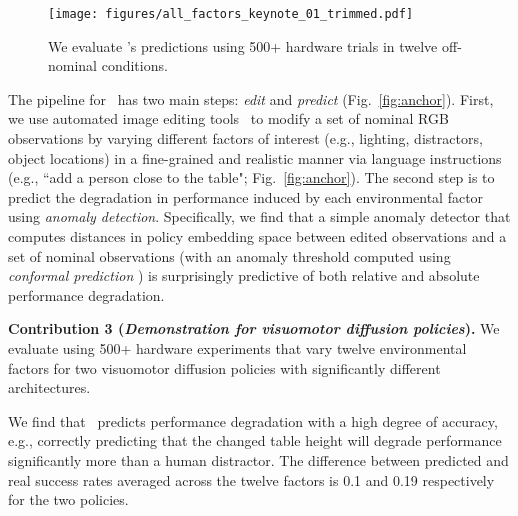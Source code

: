 \begin{figure*}[t]
    \centering
    \texttt{[image: figures/all\_factors\_keynote\_01\_trimmed.pdf]}
    \caption{We evaluate \redit's predictions using 500+ hardware trials in twelve off-nominal conditions.}
    \label{fig:all factors}
    \vspace{-5pt}
\end{figure*}

The pipeline for \redit~has two main steps: \emph{edit} and \emph{predict} (Fig.~\ref{fig:anchor}). First, we use automated image editing tools~\cite{baldridge2024imagen, esser2024scaling, controlnet, saharia2022photorealistic} to modify a set of nominal RGB observations by varying different factors of interest (e.g., lighting, distractors, object locations) in a fine-grained and realistic manner via language instructions (e.g., ``add a person close to the table"; Fig.~\ref{fig:anchor}). The second step is to predict the degradation in performance induced by each environmental factor using \emph{anomaly detection}. Specifically, we find that a simple anomaly detector that computes distances in policy embedding space between edited observations and a set of nominal observations (with an anomaly threshold computed using \emph{conformal prediction} \cite{vovk2005algorithmic}) is surprisingly predictive of both relative and absolute performance degradation. 


\vspace{2pt}
{\bf Contribution 3 (\emph{Demonstration for visuomotor diffusion policies}).} We evaluate \redit using 500+ hardware experiments that vary twelve environmental factors for two visuomotor diffusion policies with significantly different architectures.
\vspace{2pt}

We find that \redit~predicts performance degradation with a high degree of accuracy, e.g., correctly predicting that the changed table height will degrade performance significantly more than a human distractor. The difference between predicted and real success rates averaged across the twelve factors is 0.1 and 0.19 respectively for the two policies. 

